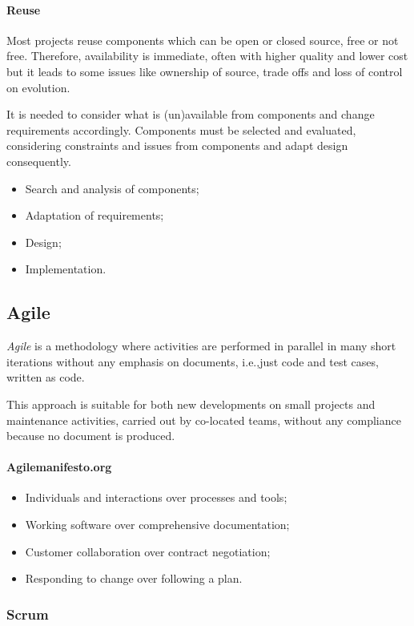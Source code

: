 \paragraph{Reuse}
Most projects reuse components which can be open or closed source, free or not free. Therefore, availability is immediate, often with higher quality and lower cost but it leads to some issues like ownership of source, trade offs and loss of control on evolution.

It is needed to consider what is (un)available from components and change requirements accordingly. Components must be selected and evaluated, considering constraints and issues from components and adapt design consequently.

\begin{itemize}
\item Search and analysis of components;
\item Adaptation of requirements;
\item Design;
\item Implementation.
\end{itemize}

\subsection{Agile}
\emph{Agile} is a methodology where activities are performed in parallel in many short iterations without any emphasis on documents, i.e.,\@ just code and test cases, written as code.

This approach is suitable for both new developments on small projects and maintenance activities, carried out by co-located teams, without any compliance because no document is produced.

\paragraph{Agilemanifesto.org}
\begin{itemize}
\item Individuals and interactions over processes and tools;
\item Working software over comprehensive documentation;
\item Customer collaboration over contract negotiation;
\item Responding to change over following a plan.
\end{itemize}

\subsubsection*{Scrum}
